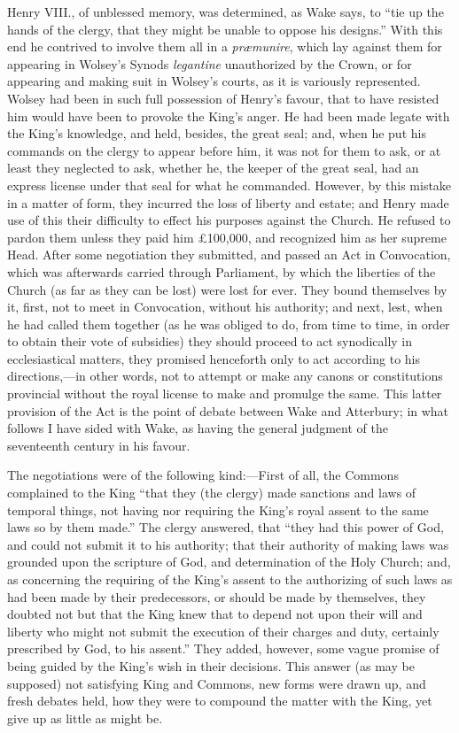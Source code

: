 Henry VIII., of unblessed
memory, was determined, as Wake says, to ``tie up the hands of the
clergy, that they might be unable to oppose his designs.'' With this
end he contrived to involve them all in a \emph{præmunire}, which lay
against them for appearing in Wolsey's Synods \emph{legantine}
unauthorized by the Crown, or for appearing and making suit in Wolsey's
courts, as it is variously represented. Wolsey had been in such full
possession of Henry's favour, that to have resisted him would have
been to provoke the King's anger. He had been made legate with the
King's knowledge, and held, besides, the great seal; and, when he put
his commands on the clergy to appear before him, it was not for them
to ask, or at least they neglected to ask, whether he, the keeper of
the great seal, had an express license under that seal for what he
commanded. However, by this mistake in a matter of form, they incurred
the loss of liberty and estate; and Henry made use of this their
difficulty to effect his purposes against the Church. He refused to
pardon them unless they paid him £100,000, and recognized him as her
supreme Head. After some negotiation they submitted, and passed an Act
in Convocation, which was afterwards carried through Parliament, by
which the liberties of the Church (as far as they can be lost) were
lost for ever. They bound themselves by it, first, not to meet in
Convocation, without his authority; and next, lest, when he had called
them together (as he was obliged to do, from time to time, in order to
obtain their vote of subsidies) they should proceed to act synodically
in ecclesiastical matters, they promised henceforth only to act
according to his directions,—in other words, not to attempt or make
any canons or constitutions provincial without the royal license to
make and promulge the same. This latter provision of the Act is the
point of debate between Wake and Atterbury; in what follows I have
sided with Wake, as having the general judgment of the seventeenth
century in his favour.

The negotiations were of the
following kind:—First of all, the Commons complained to the King ``that
they (the clergy) made sanctions and laws of temporal things,
not having nor requiring the King's royal assent to the same laws so
by them made.'' The clergy answered, that ``they had this power of God,
and could not submit it to his authority; that their authority of
making laws was grounded upon the scripture of God, and determination
of the Holy Church; and, as concerning the requiring of the King's
assent to the authorizing of such laws as had been made by their
predecessors, or should be made by themselves, they doubted not but
that the King knew that to depend not upon their will and liberty who
might not submit the execution of their charges and duty, certainly
prescribed by God, to his assent.'' They added, however, some vague
promise of being guided by the King's wish in their decisions. This
answer (as may be supposed) not satisfying King and Commons, new forms
were drawn up, and fresh debates held, how they were to compound the
matter with the King, yet give up as little as might be.


